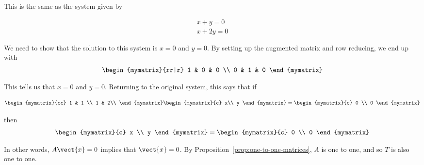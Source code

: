\begin{solution}
This is the same as the system given by

\begin{equation*}
\begin{array}{c}
x + y = 0 \\
x + 2y = 0
\end{array}
\end{equation*}

We need to show that the solution to this system is $x = 0$ and $y = 0$. By setting up the augmented matrix and row reducing, we end up with
\begin{equation*} \begin{mymatrix}{rr|r}
1 & 0 & 0 \\
0 & 1 & 0
\end{mymatrix}
\end{equation*}

This tells us that $x = 0$ and $y = 0$. Returning to the original system, this says that if 

\begin{equation*}
\begin{mymatrix}{cc}
1 & 1 \\
1 & 2\\
\end{mymatrix}
\begin{mymatrix}{c}
x\\
y
\end{mymatrix}
=
\begin{mymatrix}{c}
0 \\
0
\end{mymatrix}
\end{equation*}

then 
\begin{equation*}
\begin{mymatrix}{c}
x \\
y
\end{mymatrix}
=
\begin{mymatrix}{c}
0 \\
0
\end{mymatrix}
\end{equation*}

In other words, $A\vect{x}=0$ implies that $\vect{x}=0$. By 
Proposition~\ref{prop:one-to-one-matrices}, $A$ is one to one, and so $T$ is also one to one.


\end{solution}
